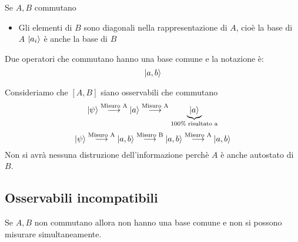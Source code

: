 \documentclass[a4paper]{article}
\begin{document}
\begin{theorem}
  Se \( A,B \) commutano
  \begin{itemize}
    \item Gli elementi di \( B \) sono diagonali nella rappresentazione di \( A \),
      cioè la base di \( A \) \( \ket{a_i} \) è anche la base di \( B \)
  \end{itemize}
  Due operatori che commutano hanno una base comune e la notazione è:
  \[
    \ket{a,b}
  \] 
\end{theorem}
\vspace{1em}
\noindent
Consideriamo che \( [A,B] \) siano osservabili che commutano
\[
  \ket{\psi} \stackrel{\text{Misuro A}}{\longrightarrow} \ket{a}
  \stackrel{\text{Misuro A}}{\longrightarrow} \underbrace{\ket{a}}_{100\% \text{ risultato a}}
\] 
\[
  \ket{\psi} \stackrel{\text{Misuro A}}{\longrightarrow} \ket{a,b}
  \stackrel{\text{Misuro B}}{\longrightarrow} \ket{a,b}
  \stackrel{\text{Misuro A}}{\longrightarrow} \ket{a,b}
\] 
Non si avrà nessuna distruzione dell'informazione perchè \( A \) è anche autostato di \( B \).

\subsection{Osservabili incompatibili}
Se \( A,B \) non commutano allora non hanno una base comune e non si possono misurare
simultaneamente.
\end{document}
